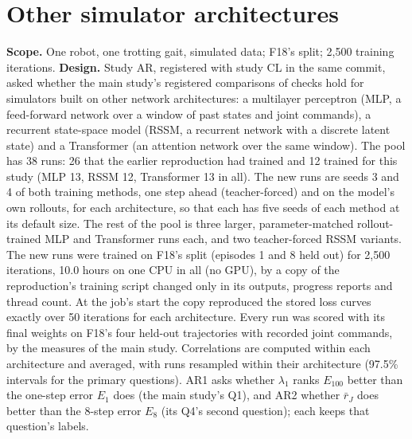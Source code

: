 \FloatBarrier
\section{Other simulator architectures}\label{app:A9}
\textbf{Scope.} One robot, one trotting gait, simulated data; F18's split; 2{,}500 training iterations.
\textbf{Design.} Study AR, registered with study CL in the same commit, asked whether the main study's registered
comparisons of checks hold for simulators built on other network architectures: a multilayer perceptron (MLP, a
feed-forward network over a window of past states and joint commands), a recurrent state-space model (RSSM, a
recurrent network with a discrete latent state) and a Transformer (an attention network over the same window). The
pool has 38 runs: 26 that the earlier reproduction had trained and 12 trained for
this study (MLP 13, RSSM 12, Transformer 13 in all). The new runs
are seeds 3 and 4 of both training methods, one step ahead (teacher-forced) and on the model's own rollouts, for each
architecture, so that each has five seeds of each method at its default size. The rest of the pool is three larger,
parameter-matched rollout-trained MLP and Transformer runs each, and two teacher-forced RSSM variants. The new runs
were trained on F18's split (episodes 1 and 8 held out) for 2{,}500 iterations, 10.0 hours on
one CPU in all (no GPU), by a copy of the reproduction's training script changed only in its outputs, progress reports and
thread count.
At the job's start the copy reproduced the stored loss curves exactly over 50 iterations for each architecture.
Every run was scored with its final weights on F18's four held-out trajectories with recorded joint commands, by the
measures of the main study. Correlations are computed within each architecture and averaged, with runs resampled
within their architecture (97.5\% intervals for the primary questions). AR1 asks whether $\lambda_1$ ranks $E_{100}$
better than the one-step error $E_1$ does (the main study's Q1), and AR2 whether $\bar r_J$ does better than the 8-step
error $E_8$ (its Q4's second question); each keeps that question's labels.

